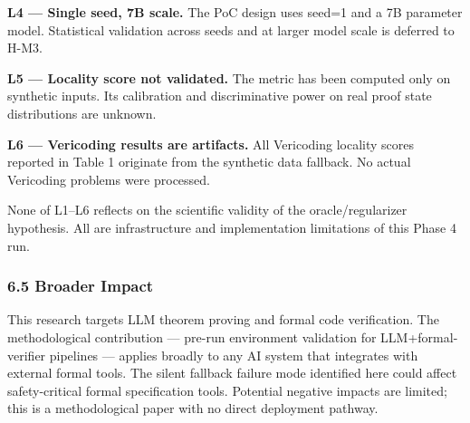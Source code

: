 \textbf{L4 — Single seed, 7B scale.} The PoC design uses seed=1 and a 7B parameter model. Statistical validation across seeds and at larger model scale is deferred to H-M3.

\textbf{L5 — Locality score not validated.} The metric has been computed only on synthetic inputs. Its calibration and discriminative power on real proof state distributions are unknown.

\textbf{L6 — Vericoding results are artifacts.} All Vericoding locality scores reported in Table 1 originate from the synthetic data fallback. No actual Vericoding problems were processed.

None of L1–L6 reflects on the scientific validity of the oracle/regularizer hypothesis. All are infrastructure and implementation limitations of this Phase 4 run.

\subsubsection{6.5 Broader Impact}

This research targets LLM theorem proving and formal code verification. The methodological contribution — pre-run environment validation for LLM+formal-verifier pipelines — applies broadly to any AI system that integrates with external formal tools. The silent fallback failure mode identified here could affect safety-critical formal specification tools. Potential negative impacts are limited; this is a methodological paper with no direct deployment pathway.
